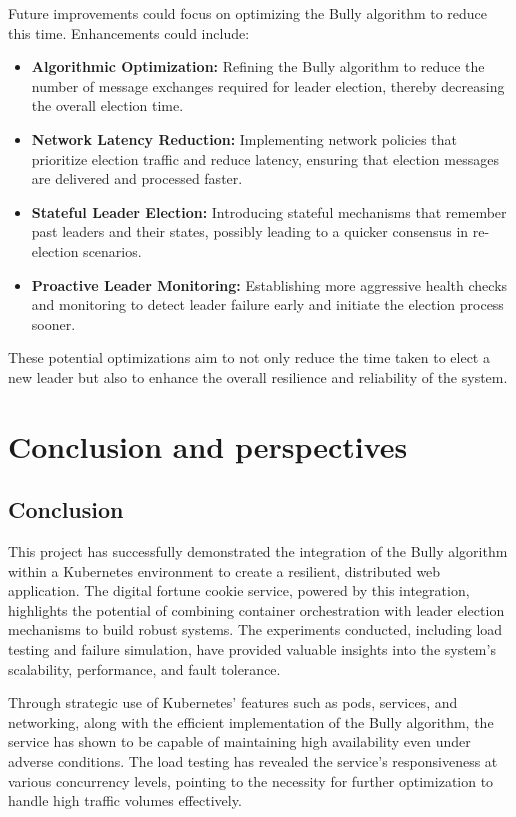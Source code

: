 \documentclass{article}
\begin{document}
      Future improvements could focus on optimizing the Bully algorithm to reduce this time. Enhancements could include:

      \begin{itemize}
        \item \textbf{Algorithmic Optimization:} Refining the Bully algorithm to reduce the number of message exchanges required for leader election, thereby decreasing the overall election time.
        \item \textbf{Network Latency Reduction:} Implementing network policies that prioritize election traffic and reduce latency, ensuring that election messages are delivered and processed faster.
        \item \textbf{Stateful Leader Election:} Introducing stateful mechanisms that remember past leaders and their states, possibly leading to a quicker consensus in re-election scenarios.
        \item \textbf{Proactive Leader Monitoring:} Establishing more aggressive health checks and monitoring to detect leader failure early and initiate the election process sooner.
      \end{itemize}

      These potential optimizations aim to not only reduce the time taken to elect a new leader but also to enhance the overall resilience and reliability of the system.


\section{Conclusion and perspectives}
      
  \subsection{Conclusion}
  This project has successfully demonstrated the integration of the Bully algorithm within a Kubernetes environment to create a resilient, distributed web application. The digital fortune cookie service, powered by this integration, highlights the potential of combining container orchestration with leader election mechanisms to build robust systems. The experiments conducted, including load testing and failure simulation, have provided valuable insights into the system's scalability, performance, and fault tolerance.

  Through strategic use of Kubernetes' features such as pods, services, and networking, along with the efficient implementation of the Bully algorithm, the service has shown to be capable of maintaining high availability even under adverse conditions. The load testing has revealed the service's responsiveness at various concurrency levels, pointing to the necessity for further optimization to handle high traffic volumes effectively.
\end{document}
